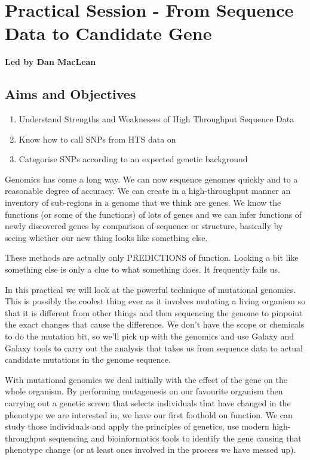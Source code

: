 \documentclass[12pt,]{book}
\providecommand{\tightlist}{%
  \setlength{\itemsep}{0pt}\setlength{\parskip}{0pt}}
\theoremstyle{definition}
\theoremstyle{definition}
\theoremstyle{remark}
\begin{document}
\section*{Practical Session - From Sequence Data to Candidate
Gene}\label{practical-session---from-sequence-data-to-candidate-gene}

\textbf{Led by Dan MacLean}

\subsection*{Aims and Objectives}\label{aims-and-objectives-1}

\begin{enumerate}
\def\labelenumi{\arabic{enumi}.}
\tightlist
\item
  Understand Strengths and Weaknesses of High Throughput Sequence Data
\item
  Know how to call SNPs from HTS data on
\item
  Categorise SNPs according to an expected genetic background
\end{enumerate}

Genomics has come a long way. We can now sequence genomes quickly and to
a reasonable degree of accuracy. We can create in a high-throughput
manner an inventory of sub-regions in a genome that we think are genes.
We know the functions (or some of the functions) of lots of genes and we
can infer functions of newly discovered genes by comparison of sequence
or structure, basically by seeing whether our new thing looks like
something else.

These methods are actually only PREDICTIONS of function. Looking a bit
like something else is only a clue to what something does. It frequently
fails us.

In this practical we will look at the powerful technique of mutational
genomics. This is possibly the coolest thing ever as it involves
mutating a living organism so that it is different from other things and
then sequencing the genome to pinpoint the exact changes that cause the
difference. We don't have the scope or chemicals to do the mutation bit,
so we'll pick up with the genomics and use Galaxy and Galaxy tools to
carry out the analysis that takes us from sequence data to actual
candidate mutations in the genome sequence.

With mutational genomics we deal initially with the effect of the gene
on the whole organism. By performing mutagenesis on our favourite
organism then carrying out a genetic screen \citep{Page:2002ji} that
selects individuals that have changed in the phenotype we are interested
in, we have our first foothold on function. We can study those
individuals and apply the principles of genetics, use modern
high-throughput sequencing and bioinformatics tools to identify the gene
causing that phenotype change (or at least ones involved in the process
we have messed up).
\end{document}
